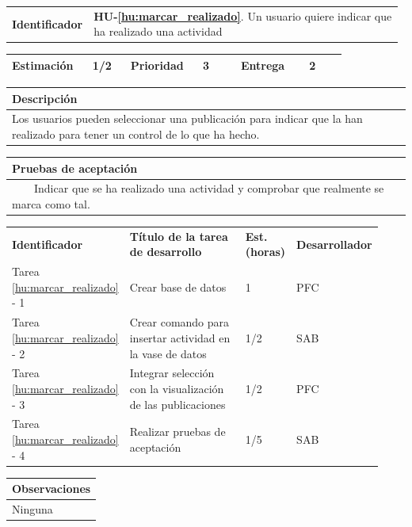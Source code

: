 \documentclass[11pt]{article}
\newcommand{\tabitem}{~~\llap{\textbullet}~~}
\begin{document}
\begin{longtable}{p{0.18\linewidth}|p{0.8\linewidth}}
  \rowcolor{LightCyan}
  \textbf{Identificador} & \textbf{{HU-\ref{hu:marcar_realizado}}}. Un usuario quiere indicar que ha realizado una actividad \\  
\end{longtable}
\vspace{-0.8cm}
\begin{longtable}{p{0.18\linewidth}|p{0.1\linewidth}|p{0.18\linewidth}|p{0.1\linewidth}|p{0.18\linewidth}|p{0.1\linewidth}}
  \toprule
  \textbf{Estimación} & 1/2 & \textbf{Prioridad} & 3 & \textbf{Entrega} & 2 \\
  \bottomrule
\end{longtable}
\vspace{-0.8cm}
\begin{longtable}{p{1.028\linewidth}}
  \textbf{Descripción}\\
  \midrule
  Los usuarios pueden seleccionar una publicación para indicar que la han realizado para tener un control de lo que ha hecho. \\
  \bottomrule
\end{longtable}
\vspace{-0.8cm}
\begin{longtable}{p{1.028\linewidth}}
  \textbf{Pruebas de aceptación}\\
  \midrule
  \tabitem Indicar que se ha realizado una actividad y comprobar que realmente se marca como tal.\\

\end{longtable}
\vspace{-0.8cm}
\begin{longtable}{p{0.18\linewidth}|p{0.48\linewidth}|p{0.1\linewidth}|p{0.17\linewidth}}
  \toprule
  \textbf{Identificador} & \textbf{Título de la tarea de desarrollo} & \textbf{Est. (horas)} & \textbf{Desarrollador} \\
  Tarea \ref{hu:marcar_realizado} - 1 & Crear base de datos & 1 & PFC\\
  Tarea \ref{hu:marcar_realizado} - 2 & Crear comando para insertar actividad en la vase de datos & 1/2 & SAB\\
  Tarea \ref{hu:marcar_realizado} - 3 & Integrar selección con la visualización de las publicaciones & 1/2 & PFC \\
  Tarea \ref{hu:marcar_realizado} - 4 & Realizar pruebas de aceptación & 1/5 & SAB \\
  \bottomrule
\end{longtable}
\vspace{-0.8cm}
\begin{longtable}{p{1.028\linewidth}}
  \textbf{Observaciones}\\
  \midrule
  Ninguna\\
  \bottomrule
\end{longtable}
\end{document}
